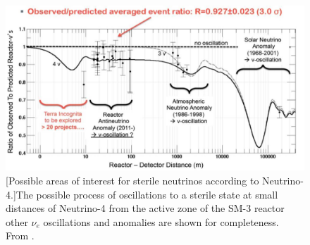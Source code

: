\begin{figure}[!h]
 \centering
 \includegraphics[width=0.8\linewidth]{Chapter2/Figs/neutrino4PlotStretched.jpg}
 [Possible areas of interest for sterile neutrinos according to Neutrino-4.]{The possible process of oscillations to a sterile state at small distances of Neutrino-4 from the active zone of the SM-3 reactor other $\nu_e$ oscillations and anomalies are shown for completeness. From \cite{neutrino4_2021}.} 
 \label{fig:neutrino4Plot}
\end{figure}


